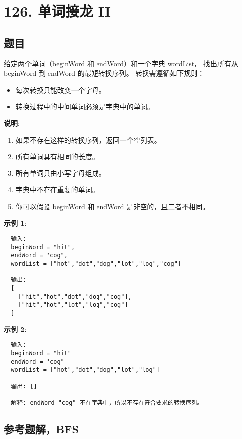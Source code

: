 \newpage
\section{126. 单词接龙 II}
\label{leetcode:126}

\subsection{题目}

给定两个单词（beginWord 和 endWord）和一个字典 wordList，
找出所有从 beginWord 到 endWord 的最短转换序列。
转换需遵循如下规则：

\begin{itemize}
  \item 每次转换只能改变一个字母。
  \item 转换过程中的中间单词必须是字典中的单词。
\end{itemize}

\textbf{说明}:

\begin{enumerate}
  \item 如果不存在这样的转换序列，返回一个空列表。
  \item 所有单词具有相同的长度。
  \item 所有单词只由小写字母组成。
  \item 字典中不存在重复的单词。
  \item 你可以假设 beginWord 和 endWord 是非空的，且二者不相同。
\end{enumerate}

\textbf{示例 1}:

\begin{verbatim}
  输入:
  beginWord = "hit",
  endWord = "cog",
  wordList = ["hot","dot","dog","lot","log","cog"]

  输出:
  [
    ["hit","hot","dot","dog","cog"],
    ["hit","hot","lot","log","cog"]
  ]
\end{verbatim}

\textbf{示例 2}:

\begin{verbatim}
  输入:
  beginWord = "hit"
  endWord = "cog"
  wordList = ["hot","dot","dog","lot","log"]

  输出: []

  解释: endWord "cog" 不在字典中，所以不存在符合要求的转换序列。
\end{verbatim}

\subsection{参考题解，BFS}

